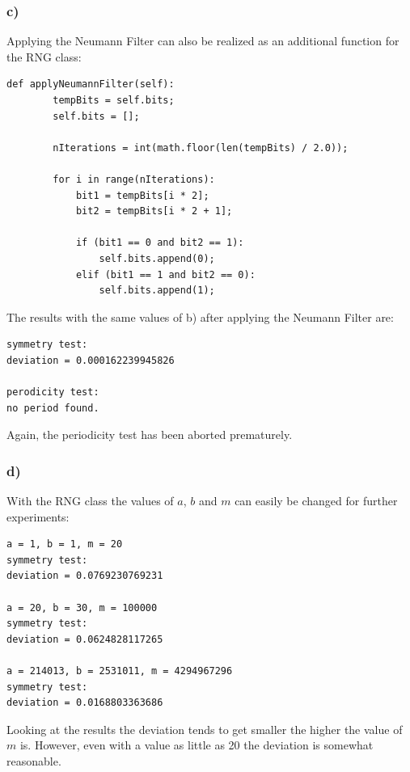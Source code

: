 \subsubsection{c)}

Applying the Neumann Filter can also be realized as an additional function for the RNG class:

\begin{lstlisting}[caption=Problem 3.6 c)]
	def applyNeumannFilter(self):
		tempBits = self.bits;
		self.bits = [];
		
		nIterations = int(math.floor(len(tempBits) / 2.0));
		
		for i in range(nIterations):
			bit1 = tempBits[i * 2];
			bit2 = tempBits[i * 2 + 1];
			
			if (bit1 == 0 and bit2 == 1):
				self.bits.append(0);
			elif (bit1 == 1 and bit2 == 0):
				self.bits.append(1);
\end{lstlisting}

The results with the same values of b) after applying the Neumann Filter are:

\begin{lstlisting}[caption=Result of 3.6 c), keywordstyle=\color{black}]
symmetry test:
deviation = 0.000162239945826

perodicity test:
no period found.
\end{lstlisting}

Again, the periodicity test has been aborted prematurely.


\subsubsection{d)}

With the RNG class the values of $a$, $b$ and $m$ can easily be changed for further experiments:

\begin{lstlisting}[caption=Result of 3.6 d), keywordstyle=\color{black}]
a = 1, b = 1, m = 20
symmetry test:
deviation = 0.0769230769231

a = 20, b = 30, m = 100000
symmetry test:
deviation = 0.0624828117265

a = 214013, b = 2531011, m = 4294967296
symmetry test:
deviation = 0.0168803363686
\end{lstlisting}

Looking at the results the deviation tends to get smaller the higher the value of $m$ is. However, even with a value as little as 20 the deviation is somewhat reasonable.

